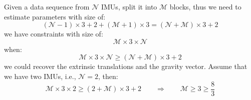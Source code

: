 \documentclass[12pt, onecolumn]{article}
\begin{document}
	Given a data sequence from $\mathcal{N}$ IMUs, split it into $\mathcal{M}$ blocks, thus we need to estimate parameters with size of:
	\begin{equation}
	\left( \mathcal{N}-1\right) \times 3+2+\left( \mathcal{M}+1\right) \times 3=
	\left(\mathcal{N}+\mathcal{M} \right)\times 3 +2
	\end{equation}
	we have constraints with size of:
	\begin{equation}
	\mathcal{M}\times 3\times \mathcal{N}
	\end{equation}
	when:
	\begin{equation}
	\mathcal{M}\times 3\times \mathcal{N}\ge \left(\mathcal{N}+\mathcal{M} \right)\times 3 +2
	\end{equation}
	we could recover the extrinsic translations and the gravity vector.
	Assume that we have two IMUs, i.e., $\mathcal{N}=2$, then:
	\begin{equation}
	\mathcal{M}\times 3\times 2\ge \left(2+\mathcal{M} \right)\times 3 +2
	\qquad\Rightarrow\qquad
	\mathcal{M}\ge 3\ge \frac{8}{3}
	\end{equation}
	
\end{document}

